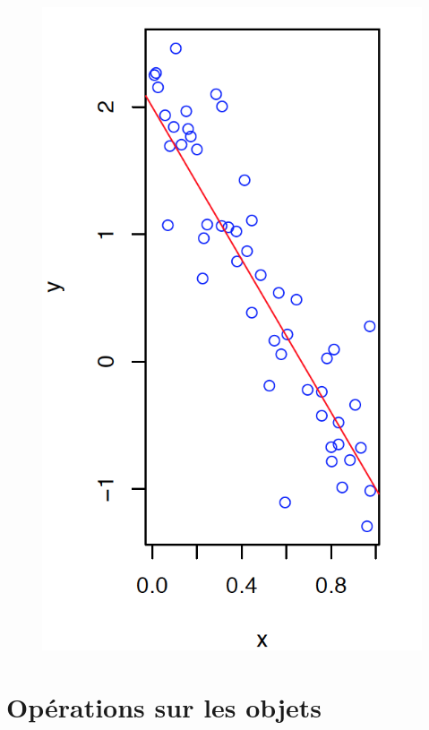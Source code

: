 \begin{figure}[H]\begin{center}\includegraphics[scale=0.5]{ilu/MoramePlot.png}\end{center}\end{figure}

\section{Opérations sur les objets}
